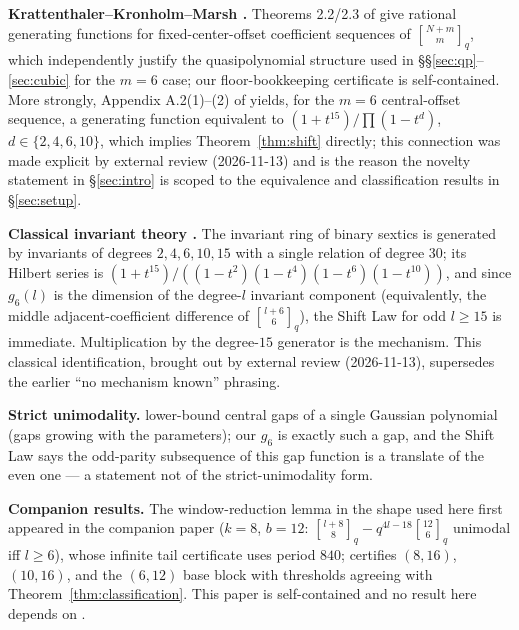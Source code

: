 \documentclass[11pt,reqno]{article}
\theoremstyle{definition}
\newcommand{\ggbrack}[2]{\genfrac{[}{]}{0pt}{}{#1}{#2}_q}
\begin{document}
\textbf{Krattenthaler--Kronholm--Marsh \cite{KKM}.} Theorems 2.2/2.3 of \cite{KKM} give rational generating functions for fixed-center-offset coefficient sequences of $\ggbrack{N+m}{m}$, which independently justify the quasipolynomial structure used in \S\S\ref{sec:qp}--\ref{sec:cubic} for the $m=6$ case; our floor-bookkeeping certificate is self-contained. More strongly, Appendix A.2(1)--(2) of \cite{KKM} yields, for the $m=6$ central-offset sequence, a generating function equivalent to $(1+t^{15})\big/\prod(1-t^{d})$, $d\in\{2,4,6,10\}$, which implies Theorem~\ref{thm:shift} directly; this connection was made explicit by external review (2026-11-13) and is the reason the novelty statement in \S\ref{sec:intro} is scoped to the equivalence and classification results in \S\ref{sec:setup}.

\textbf{Classical invariant theory \cite{GY}.} The invariant ring of binary sextics is generated by invariants of degrees $2,4,6,10,15$ with a single relation of degree $30$; its Hilbert series is $(1+t^{15})/((1-t^2)(1-t^4)(1-t^6)(1-t^{10}))$, and since $g_6(l)$ is the dimension of the degree-$l$ invariant component (equivalently, the middle adjacent-coefficient difference of $\ggbrack{l+6}{6}$), the Shift Law for odd $l\ge15$ is immediate. Multiplication by the degree-$15$ generator is the mechanism. This classical identification, brought out by external review (2026-11-13), supersedes the earlier ``no mechanism known'' phrasing.

\textbf{Strict unimodality.} \cite{PP,Bounds,Dhand} lower-bound central gaps of a single Gaussian polynomial (gaps growing with the parameters); our $g_6$ is exactly such a gap, and the Shift Law says the odd-parity subsequence of this gap function is a translate of the even one --- a statement not of the strict-unimodality form.

\textbf{Companion results.} The window-reduction lemma in the shape used here first appeared in the companion paper \cite{M06} ($k=8$, $b=12$: $\ggbrack{l+8}{8}-q^{4l-18}\ggbrack{12}{6}$ unimodal iff $l\ge6$), whose infinite tail certificate uses period $840$; \cite{M07} certifies $(8,16)$, $(10,16)$, and the $(6,12)$ base block with thresholds agreeing with Theorem~\ref{thm:classification}. This paper is self-contained and no result here depends on \cite{M06,M07}.
\end{document}
